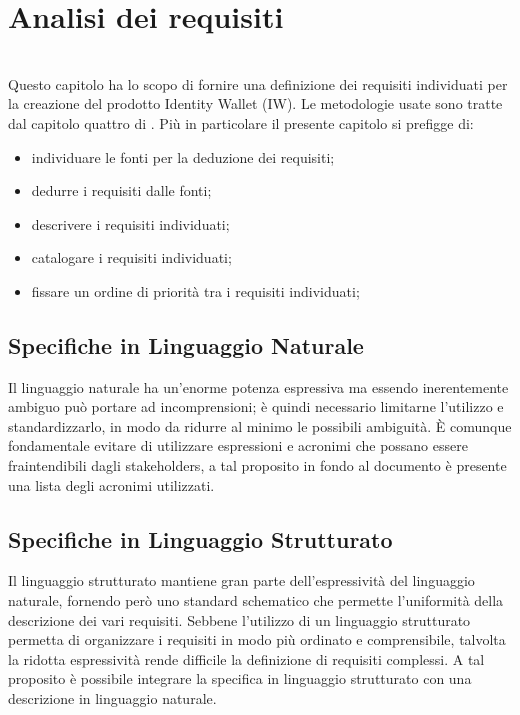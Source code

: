 
\chapter{Analisi dei requisiti}
\label{cap:analisi-requisiti}

\\
Questo capitolo ha lo scopo di fornire una definizione dei requisiti individuati per la creazione del prodotto Identity Wallet (IW). Le metodologie usate sono tratte dal capitolo quattro di \cite{som:swe}.
Più in particolare il presente capitolo si prefigge di: 
\begin{itemize}
    \item individuare le fonti per la deduzione dei requisiti; 
    \item dedurre i requisiti dalle fonti; 
    \item descrivere i requisiti individuati; 
    \item catalogare i requisiti individuati; 
    \item fissare un ordine di priorità tra i requisiti individuati;
\end{itemize}
\section{Specifiche in Linguaggio Naturale}
Il linguaggio naturale ha un’enorme potenza espressiva ma essendo inerentemente ambiguo può portare ad incomprensioni; è quindi necessario limitarne l’utilizzo e standardizzarlo, in modo da ridurre al minimo le possibili ambiguità. È comunque fondamentale evitare di utilizzare espressioni e acronimi che possano essere fraintendibili dagli stakeholders, a tal proposito in fondo al documento è presente una lista degli acronimi utilizzati.
\section{Specifiche in Linguaggio Strutturato}
Il linguaggio strutturato mantiene gran parte dell’espressività del linguaggio naturale, fornendo però uno standard schematico che permette l’uniformità della descrizione dei vari requisiti. Sebbene l’utilizzo di un linguaggio strutturato permetta di organizzare i requisiti in modo più ordinato e comprensibile, talvolta la ridotta espressività rende difficile la definizione di requisiti complessi. A tal proposito è possibile integrare la specifica in linguaggio strutturato con una descrizione in linguaggio naturale.
